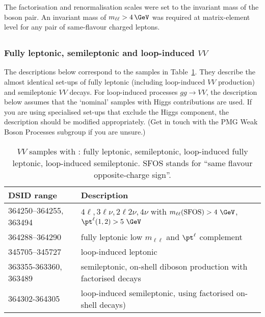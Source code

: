 The factorisation and renormalisation scales were set to the invariant mass of
the boson pair. An invariant mass of $m_{\ell\ell} > 4\,\GeV$ was required
at matrix-element level for any pair of same-flavour charged leptons.


\subsection[Sherpa]{\SHERPA}

\subsubsection{Fully leptonic, semileptonic and loop-induced \texorpdfstring{$VV$}{VV}}

The descriptions below correspond to the samples in
Table~\ref{tab:MB-sherpa}. They describe the almost
identical set-ups of fully leptonic (including loop-induced $VV$ production)
and semileptonic $VV$ decays. For loop-induced processes $gg\to VV$, 
the description below assumes that the `nominal' samples with 
Higgs contributions are used. If you are using specialised set-ups that
exclude the Higgs component, the description should be modified appropriately.
(Get in touch with the PMG Weak Boson Processes subgroup if you are unsure.)

\begin{table}[htbp]
  \caption{$VV$ samples with \SHERPA: fully leptonic, semileptonic,
    loop-induced fully leptonic, loop-induced semileptonic. SFOS stands for
    \enquote{same flavour opposite-charge sign}.}%
  \label{tab:MB-sherpa}
  \centering
  \begin{tabular}{l l}
    \toprule
    DSID range & Description \\
    \midrule
    364250--364255, 363494   & $4\ell, 3\ell\nu, 2\ell 2\nu, 4\nu$ with $m_{\ell\ell}\mathrm{(SFOS)} > 4~\GeV$, $\pt^\ell(1,2)>5~\GeV$\\
    364288--364290 & fully leptonic low $m_{\ell\ell}$ and $\pt^\ell$ complement\\
    \midrule
    345705--345727   & loop-induced leptonic\\
    \midrule
    363355-363360, 363489   & semileptonic, on-shell diboson production with factorised decays\\
    \midrule
    364302-364305   & loop-induced semileptonic, using factorised on-shell decays)\\
    \bottomrule
  \end{tabular}
\end{table}

